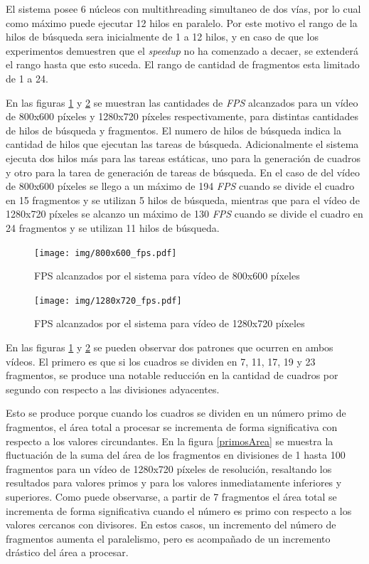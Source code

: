 El sistema posee 6 núcleos con multithreading simultaneo de dos vías, por lo
cual como máximo puede ejecutar 12 hilos en paralelo. Por este motivo el rango
de la hilos de búsqueda sera inicialmente de 1 a 12 hilos, y en caso de que los
experimentos demuestren que el \emph{speedup} no ha comenzado a decaer, se
extenderá el rango hasta que esto suceda. El rango de cantidad de fragmentos
esta limitado de 1 a 24.

En las figuras \ref{800fps} y \ref{1280fps} se muestran las cantidades de
\emph{FPS} alcanzados para un vídeo de 800x600 píxeles y 1280x720 píxeles
respectivamente, para distintas cantidades de hilos de búsqueda y fragmentos.
El numero de hilos de búsqueda indica la cantidad de hilos que ejecutan las
tareas de búsqueda. Adicionalmente el sistema ejecuta dos hilos más para las
tareas estáticas, uno para la generación de cuadros y otro para la tarea de
generación de tareas de búsqueda. En el caso de del vídeo de 800x600 píxeles se
llego a un máximo de 194 \emph{FPS} cuando se divide el cuadro en 15 fragmentos
y se utilizan 5 hilos de búsqueda, mientras que para el vídeo de 1280x720
píxeles se alcanzo un máximo de 130 \emph{FPS} cuando se divide el cuadro en 24
fragmentos y se utilizan 11 hilos de búsqueda.

\begin{figure}[!h]

	\texttt{[image: img/800x600\_fps.pdf]}
	\caption{FPS alcanzados por el sistema para vídeo de 800x600 píxeles}
	\label{800fps}

\end{figure}

\begin{figure}[!h]

	\texttt{[image: img/1280x720\_fps.pdf]}
	\caption{FPS alcanzados por el sistema para vídeo de 1280x720 píxeles}
	\label{1280fps}

\end{figure}

En las figuras \ref{800fps} y \ref{1280fps} se pueden observar dos patrones que
ocurren en ambos vídeos. El primero es que si los cuadros se dividen en 7, 11,
17, 19 y 23 fragmentos, se produce una notable reducción en la cantidad de
cuadros por segundo con respecto a las divisiones adyacentes.

Esto se produce porque cuando los cuadros se dividen en un número primo de
fragmentos, el área total a procesar se incrementa de forma significativa con
respecto a los valores circundantes. En la figura \ref{primosArea} se muestra la
fluctuación de la suma del área de los fragmentos en divisiones de 1 hasta 100
fragmentos para un vídeo de 1280x720 píxeles de resolución, resaltando los
resultados para valores primos y para los valores inmediatamente inferiores y
superiores. Como puede observarse, a partir de 7 fragmentos el área total se
incrementa de forma significativa cuando el número es primo con respecto a los
valores cercanos con divisores. En estos casos, un incremento del número
de fragmentos aumenta el paralelismo, pero es acompañado de un incremento
drástico del área a procesar.

